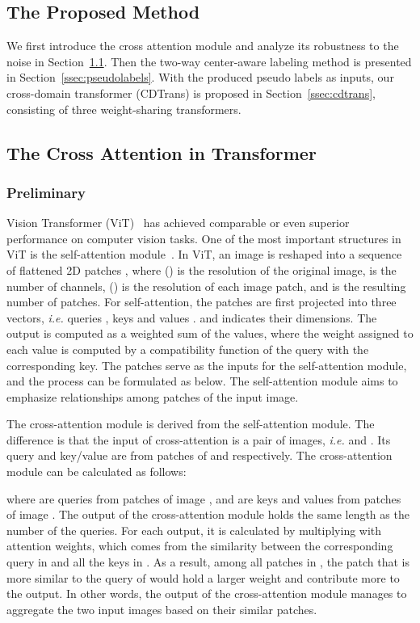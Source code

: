 \documentclass[dvipsnames, svgnames, x11names, table]{article} \usepackage{iclr2022_conference,times}
\begin{document}
\begin{spacing}{1.0}
\section{The Proposed Method}
We first introduce the cross attention module and analyze its robustness to the noise in Section~\ref{ssec:crossattn}. Then the two-way center-aware labeling method is presented in Section~\ref{ssec:pseudolabels}. With the produced pseudo labels as inputs, our cross-domain transformer (CDTrans) is proposed in Section~\ref{ssec:cdtrans}, consisting of three weight-sharing transformers.

\subsection{The Cross Attention in Transformer}
\label{ssec:crossattn}
\subsubsection{Preliminary}
Vision Transformer (ViT)~\citep{dosovitskiy2020image} has achieved comparable or even superior performance on computer vision tasks. One of the most important structures in ViT is the self-attention module~\citep{vaswani2017attention}. In ViT, an image  is reshaped into a sequence of flattened 2D patches , where () is the resolution of the original image,  is the number of channels, () is the resolution of each image patch, and  is the resulting number of patches. For self-attention, the patches are first projected into three vectors, \textit{i.e.} queries , keys  and values .  and  indicates their dimensions.
The output is computed as a weighted sum of the values, where the weight assigned to each value is computed by a compatibility function of the query with the corresponding key. The  patches serve as the inputs for the self-attention module, and the process can be formulated as below. The self-attention module aims to emphasize relationships among patches of the input image.




The cross-attention module is derived from the self-attention module. The difference is that the input of cross-attention is a pair of images, \textit{i.e.}  and . Its query and key/value are from patches of  and  respectively. The cross-attention module can be calculated as follows:

where  are queries from  patches of image , and  are keys and values from  patches of image . 
The output of the cross-attention module holds the same length  as the number of the queries. For each output, it is calculated by multiplying  with attention weights, which comes from the similarity between the corresponding query in  and all the keys in . As a result, among all patches in , the patch that is more similar to the query of  would hold a larger weight and contribute more to the output. In other words, the output of the cross-attention module manages to aggregate the two input images based on their similar patches. 



\end{spacing}
\end{document}
